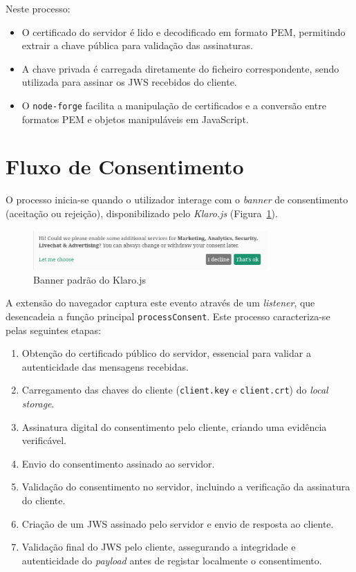 Neste processo:
\begin{itemize}
    \item O certificado do servidor é lido e decodificado em formato PEM, permitindo extrair a chave pública para validação das assinaturas.
    \item A chave privada é carregada diretamente do ficheiro correspondente, sendo utilizada para assinar os JWS recebidos do cliente.
    \item O \texttt{node-forge} facilita a manipulação de certificados e a conversão entre formatos PEM e objetos manipuláveis em JavaScript.
\end{itemize}

\section{Fluxo de Consentimento}

O processo inicia-se quando o utilizador interage com o \textit{banner} de consentimento (aceitação ou rejeição), disponibilizado pelo \textit{Klaro.js} (Figura~\ref{fig:klarojs-banner}).

\begin{figure}[h]
    \centering
	\includegraphics[width=0.8\textwidth]{images/klaro_banner.png}
    \caption{Banner padrão do Klaro.js}
    \label{fig:klarojs-banner}
\end{figure}

A extensão do navegador captura este evento através de um \textit{listener}, que desencadeia a função principal \texttt{processConsent}. Este processo caracteriza-se pelas seguintes etapas:
\begin{enumerate}
    \item Obtenção do certificado público do servidor, essencial para validar a autenticidade das mensagens recebidas.
    \item Carregamento das chaves do cliente (\texttt{client.key} e \texttt{client.crt}) do \textit{local storage}.
    \item Assinatura digital do consentimento pelo cliente, criando uma evidência verificável.
    \item Envio do consentimento assinado ao servidor.
    \item Validação do consentimento no servidor, incluindo a verificação da assinatura do cliente.
    \item Criação de um JWS assinado pelo servidor e envio de resposta ao cliente.
    \item Validação final do JWS pelo cliente, assegurando a integridade e autenticidade do \textit{payload} antes de registar localmente o consentimento.
\end{enumerate}

